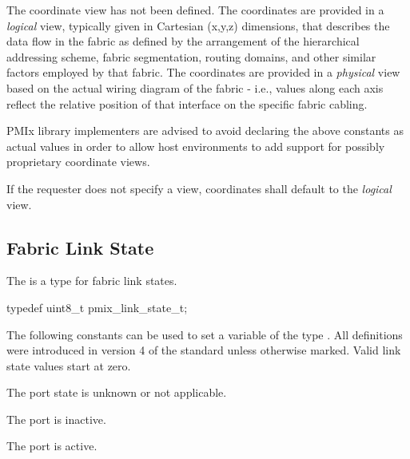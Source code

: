 \begin{constantdesc}
%
The coordinate view has not been defined.
%
The coordinates are provided in a \emph{logical} view, typically given in Cartesian (x,y,z) dimensions, that describes the data flow in the fabric as defined by the arrangement of the hierarchical addressing scheme, fabric segmentation, routing domains, and other similar factors employed by that fabric.
%
The coordinates are provided in a \emph{physical} view based on the actual wiring diagram of the fabric - i.e., values along each axis reflect the relative position of that interface on the specific fabric cabling.
%
\end{constantdesc}

\adviceimplstart
\ac{PMIx} library implementers are advised to avoid declaring the above constants as actual  values in order to allow host environments to add support for possibly proprietary coordinate views.
\adviceimplend

If the requester does not specify a view, coordinates shall default to the \emph{logical} view.


\subsection{Fabric Link State}

The  is a  type for fabric link states.

\cspecificstart
\begin{codepar}
typedef uint8_t pmix_link_state_t;
\end{codepar}
\cspecificend

The following constants can be used to set a variable of the type . All definitions were introduced in version 4 of the standard unless otherwise marked. Valid link state values start at zero.

\begin{constantdesc}
%
The port state is unknown or not applicable.

The port is inactive.

The port is active.

\end{constantdesc}

